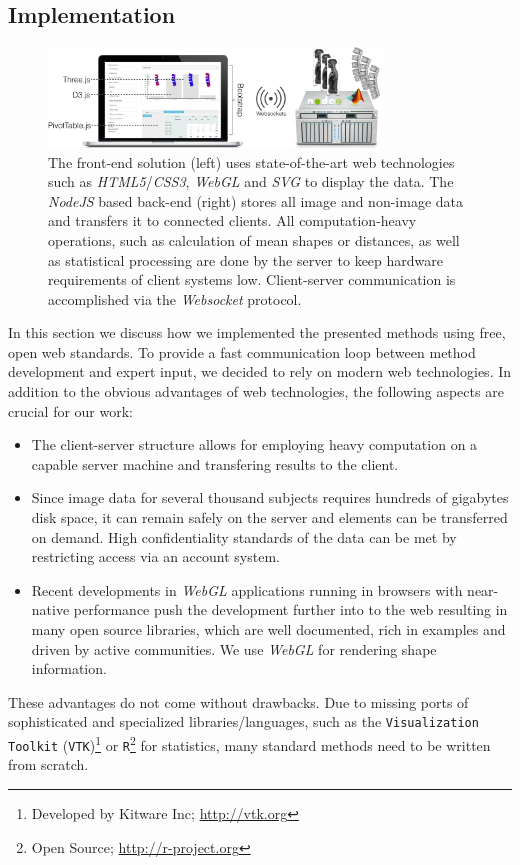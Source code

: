 \documentclass[journal]{style/vgtc} 			          %
\begin{document}
\subsection{Implementation} \label{implementation}
\begin{figure}[htb]
 \centering
 \label{fig:technologies}
 \includegraphics[width=3.5in]{figures/technologies}
 \caption{The front-end solution (left) uses state-of-the-art web technologies such as \emph{HTML5}/\emph{CSS3}, \emph{WebGL} and \emph{SVG} to display the data.
 The \emph{NodeJS} based back-end (right) stores all image and non-image data and transfers it to connected clients.
 All computation-heavy operations, such as calculation of mean shapes or distances, as well as statistical processing are done by the server to keep hardware requirements of client systems low. 
 Client-server communication is accomplished via the \emph{Websocket} protocol.
 }
\end{figure}
In this section we discuss how we implemented the presented methods using free, open web standards.
%
To provide a fast communication loop between method development and expert input, we decided to rely on modern web technologies.
%
In addition to the obvious advantages of web technologies, the following aspects are crucial for our work:
\begin{itemize}
	\item The client-server structure allows for employing heavy computation on a capable server machine and transfering results to the client.
	\item Since image data for several thousand subjects requires hundreds of gigabytes disk space, it can remain safely on the server and elements can be transferred on demand.
	High confidentiality standards of the data can be met by restricting access via an account system.
	\item Recent developments in \emph{WebGL} applications running in browsers with near-native performance push the development further into to the web resulting in many open source libraries, which are well documented, rich in examples and driven by active communities. We use \emph{WebGL} for rendering shape information.
\end{itemize}
These advantages do not come without drawbacks.
%
Due to missing ports of sophisticated and specialized libraries/languages, such as the \texttt{Visualization Toolkit} (\texttt{VTK})\footnote{Developed by Kitware Inc; \url{http://vtk.org}} or \texttt{R}\footnote{Open Source; \url{http://r-project.org}} for statistics, many standard methods need to be written from scratch.
%
\end{document}
